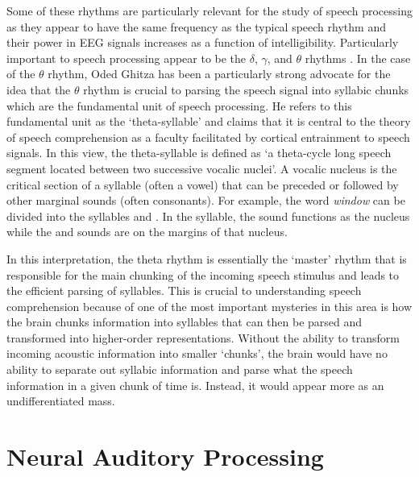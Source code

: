 \documentclass[titlepage]{article}
\begin{document}
    Some of these rhythms are particularly relevant for the study of speech
    processing as they appear to have the same frequency as the typical speech
    rhythm and their power in EEG signals increases as a function of
    intelligibility. Particularly important to speech processing appear to be
    the $\delta$, $\gamma$, and $\theta$ rhythms \cite{Ghitza2009,Meyer2018}.
    In the case of the $\theta$ rhythm, Oded Ghitza has been a particularly
    strong advocate for the idea that the $\theta$ rhythm is crucial to parsing
    the speech signal into syllabic chunks which are the fundamental unit of
    speech processing. He refers to this fundamental unit as the
    `theta-syllable' \cite{Ghitza2013a} and claims that it is central to the
    theory of speech comprehension as a faculty facilitated by cortical
    entrainment to speech signals. In this view, the theta-syllable is defined
    as `a theta-cycle long speech segment located between two successive vocalic
    nuclei'. A vocalic nucleus is the critical section of a syllable (often a
    vowel) that can be preceded or followed by other marginal sounds (often
    consonants). For example, the word \textit{window} can be divided into the
    syllables  and . In the 
    syllable, the  sound functions as the nucleus while the
     and  sounds are on the margins of that nucleus.

    In this interpretation, the theta rhythm is essentially the `master' rhythm
    that is responsible for the main chunking of the incoming speech stimulus
    and leads to the efficient parsing of syllables. This is crucial to
    understanding speech comprehension because of one of the most important
    mysteries in this area is how the brain chunks information into syllables
    that can then be parsed and transformed into higher-order representations.
    Without the ability to transform incoming acoustic information into smaller
    `chunks', the brain would have no ability to separate out syllabic
    information and parse what the speech information in a given chunk of time
    is. Instead, it would appear more as an undifferentiated mass.

\section{Neural Auditory Processing} \label{corticalAuditoryProcessing}
\end{document}
